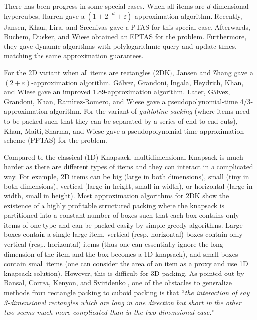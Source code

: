 \documentclass[10pt,a4paper]{amsart}
\newcommand{\eps}{\varepsilon}
\theoremstyle{definition}
\begin{document}
There has been progress in some special cases.
When all items are $d$-dimensional hypercubes, Harren \cite{harren-journal} gave a $(1+2^{-d}+\eps)$-approximation algorithm. 
Recently, Jansen, Khan, Lira, and Sreenivas \cite{Jansencubepacking22} gave a PTAS for this special case. 
Afterwards, Buchem, Dueker, and Wiese \cite{BuchemDW24}  obtained an EPTAS for the problem. 
Furthermore, they gave dynamic algorithms with polylogarithmic query and update times, matching the same approximation guarantees. 


For the 2D variant when all items are rectangles (2DK), Jansen and Zhang \cite{jansen-zhang} gave a $(2+\eps)$-approximation algorithm. 
G{\'{a}}lvez, Grandoni, Ingala, Heydrich, Khan, and Wiese \cite{2dks-Lpacking} 
gave an improved 1.89-approximation algorithm. Later, G{\'{a}}lvez, Grandoni, Khan, Ram{\'{\i}}rez{-}Romero, and Wiese \cite{Galvez00RW21} gave a pseudopolynomial-time 4/3-approximation algorithm. 
For the variant of {\em guillotine packing} (where items need to be packed such that they can be separated by a series of end-to-end cuts), Khan, Maiti, Sharma, and Wiese \cite{KMSW21} gave a pseudopolynomial-time approximation scheme (PPTAS) for the problem. 
 

Compared to the classical (1D) Knapsack, multidimensional Knapsack is much harder as there are different types of items and they can interact in a complicated way. 
For example, 2D items can be big (large in both dimensions), small (tiny in both dimensions), vertical (large in height, small in width), or horizontal (large in width, small in height).
Most approximation algorithms for 2DK show the existence of a highly profitable structured packing where the knapsack is partitioned into a constant number of boxes such that each box contains only items of one type and can be packed easily by simple greedy algorithms. 
Large boxes contain a single large item, vertical (resp. horizontal) boxes contain only vertical (resp. horizontal) items (thus one can essentially ignore the long dimension of the item and the box becomes a 1D knapsack), and small boxes contain small items (one can consider the area of an item as a proxy and use 1D knapsack solution). 
However, this is difficult for 3D packing.  
As pointed out by Bansal, Correa, Kenyon, and Sviridenko \cite{bansal2006bin}, one of the obstacles to generalize methods from rectangle packing to cuboid packing is that ``{\em the interaction of say 3-dimensional rectangles which are long in one direction but short in the other two seems much more complicated than in the two-dimensional case.}'' 
\end{document}
